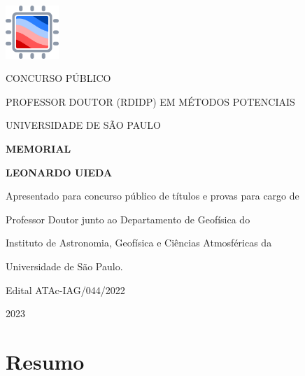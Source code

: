 \documentclass[10pt,a4paper,oneside]{book}
\newcommand{\Year}{2023}
\newcommand{\Author}{Leonardo Uieda}
\begin{document}
\pagestyle{plain}
\frontmatter

\begin{titlepage}
  \begin{center}
    \includegraphics[height=2cm]{images/logo.pdf}
    \vspace{1cm}

    CONCURSO PÚBLICO

    PROFESSOR DOUTOR (RDIDP) EM MÉTODOS POTENCIAIS

    UNIVERSIDADE DE SÃO PAULO
    \vspace{5cm}

    \textbf{\LARGE MEMORIAL}
    \vspace{1cm}

    \textbf{\LARGE \MakeUppercase{\Author{}}}
    \vspace{5cm}

    {\small
      Apresentado para concurso público de títulos e provas para cargo de

      Professor Doutor junto ao Departamento de Geofísica do

      Instituto de Astronomia, Geofísica e Ciências Atmosféricas da

      Universidade de São Paulo.
      \vspace{1cm}

      Edital ATAc-IAG/044/2022
    }
    \vfill

    \Year{}
  \end{center}
\end{titlepage}

\chapter*{Resumo}
\end{document}
